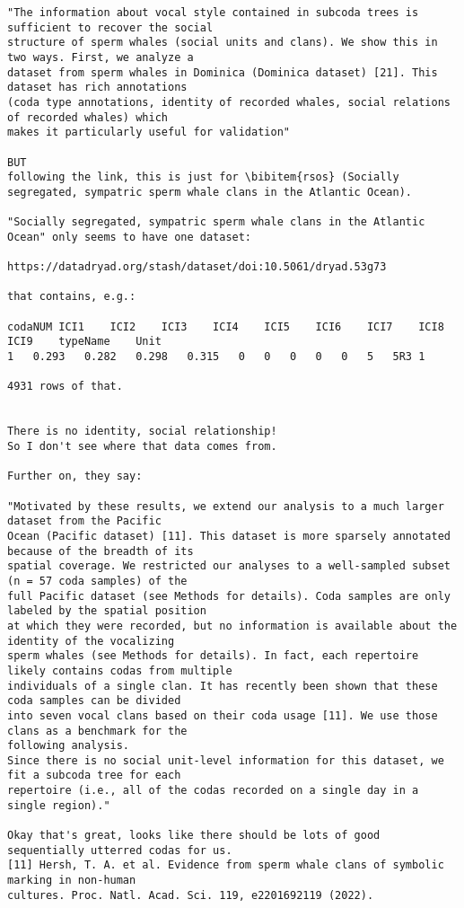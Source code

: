 \documentclass{article}
\begin{document}
\begin{lstlisting}[breaklines=true, breakatwhitespace=true, columns=flexible, basicstyle=\ttfamily\small]
"The information about vocal style contained in subcoda trees is sufficient to recover the social
structure of sperm whales (social units and clans). We show this in two ways. First, we analyze a
dataset from sperm whales in Dominica (Dominica dataset) [21]. This dataset has rich annotations
(coda type annotations, identity of recorded whales, social relations of recorded whales) which
makes it particularly useful for validation"

BUT
following the link, this is just for \bibitem{rsos} (Socially segregated, sympatric sperm whale clans in the Atlantic Ocean).

"Socially segregated, sympatric sperm whale clans in the Atlantic Ocean" only seems to have one dataset:

https://datadryad.org/stash/dataset/doi:10.5061/dryad.53g73

that contains, e.g.:

codaNUM ICI1    ICI2    ICI3    ICI4    ICI5    ICI6    ICI7    ICI8    ICI9    typeName    Unit
1   0.293   0.282   0.298   0.315   0   0   0   0   0   5   5R3 1

4931 rows of that.


There is no identity, social relationship!
So I don't see where that data comes from.

Further on, they say:

"Motivated by these results, we extend our analysis to a much larger dataset from the Pacific
Ocean (Pacific dataset) [11]. This dataset is more sparsely annotated because of the breadth of its
spatial coverage. We restricted our analyses to a well-sampled subset (n = 57 coda samples) of the
full Pacific dataset (see Methods for details). Coda samples are only labeled by the spatial position
at which they were recorded, but no information is available about the identity of the vocalizing
sperm whales (see Methods for details). In fact, each repertoire likely contains codas from multiple
individuals of a single clan. It has recently been shown that these coda samples can be divided
into seven vocal clans based on their coda usage [11]. We use those clans as a benchmark for the
following analysis.
Since there is no social unit-level information for this dataset, we fit a subcoda tree for each
repertoire (i.e., all of the codas recorded on a single day in a single region)."

Okay that's great, looks like there should be lots of good sequentially utterred codas for us.
[11] Hersh, T. A. et al. Evidence from sperm whale clans of symbolic marking in non-human
cultures. Proc. Natl. Acad. Sci. 119, e2201692119 (2022).


\end{lstlisting}
\end{document}
